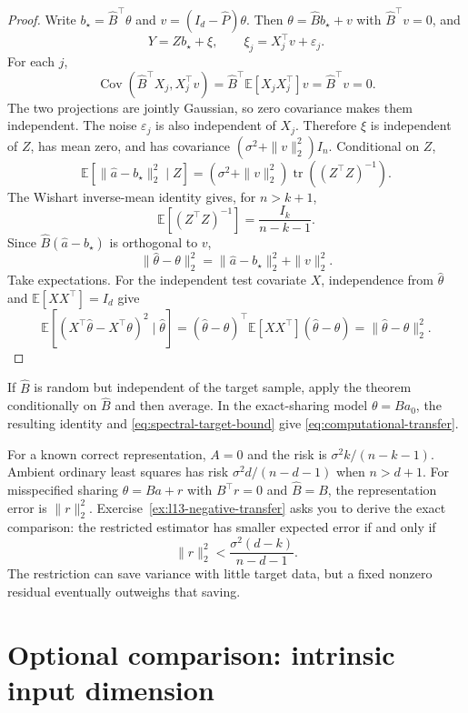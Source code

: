 \documentclass[11pt,twoside]{article}
\newcommand{\E}{\mathbb E}
\theoremstyle{definition}
\theoremstyle{remark}
\begin{document}
\begin{proof}
Write $b_\star=\widehat B^\top\theta$ and
$v=(I_d-\widehat P)\theta$. Then
$\theta=\widehat Bb_\star+v$ with $\widehat B^\top v=0$, and
\[
 Y=Zb_\star+\xi,\qquad \xi_j=X_j^\top v+\varepsilon_j.
\]
For each $j$,
\[
 \operatorname{Cov}(\widehat B^\top X_j,X_j^\top v)
 =\widehat B^\top\E[X_jX_j^\top]v
 =\widehat B^\top v=0.
\]
The two projections are jointly Gaussian, so zero covariance makes them
independent. The noise $\varepsilon_j$ is also independent of $X_j$.
Therefore $\xi$ is independent of $Z$, has mean zero, and has covariance
$(\sigma^2+\|v\|_2^2)I_n$. Conditional on $Z$,
\[
 \E[\|\widehat a-b_\star\|_2^2\mid Z]
 =(\sigma^2+\|v\|_2^2)\operatorname{tr}((Z^\top Z)^{-1}).
\]
The Wishart inverse-mean identity gives, for $n>k+1$,
\begin{equation}
 \E[(Z^\top Z)^{-1}]=\frac{I_k}{n-k-1}.
 \label{eq:inverse-wishart-mean}
\end{equation}
Since $\widehat B(\widehat a-b_\star)$ is orthogonal to $v$,
\[
 \|\widehat\theta-\theta\|_2^2
 =\|\widehat a-b_\star\|_2^2+\|v\|_2^2.
\]
Take expectations. For the independent test covariate $X$, independence from
$\widehat\theta$ and
$\E[XX^\top]=I_d$ give
\[
 \E[(X^\top\widehat\theta-X^\top\theta)^2\mid\widehat\theta]
 =(\widehat\theta-\theta)^\top\E[XX^\top]
   (\widehat\theta-\theta)
 =\|\widehat\theta-\theta\|_2^2.
\]
\end{proof}

If $\widehat B$ is random but independent of the target sample, apply the
theorem conditionally on $\widehat B$ and then average. In the exact-sharing
model $\theta=Ba_0$, the resulting identity and
\cref{eq:spectral-target-bound} give \cref{eq:computational-transfer}.

For a known correct representation, $A=0$ and the risk is
$\sigma^2k/(n-k-1)$. Ambient ordinary least squares has risk
$\sigma^2d/(n-d-1)$ when $n>d+1$.
For misspecified sharing $\theta=Ba+r$ with $B^\top r=0$ and
$\widehat B=B$, the representation error is $\|r\|_2^2$.
Exercise~\ref{ex:l13-negative-transfer} asks you to derive the exact comparison:
the restricted estimator has smaller expected error if and only if
\[
 \|r\|_2^2<\frac{\sigma^2(d-k)}{n-d-1}.
\]
The restriction can save variance with little target data, but a fixed
nonzero residual eventually outweighs that saving.
\section{Optional comparison: intrinsic input dimension}
\label{app:intrinsic-dimension}
\end{document}

